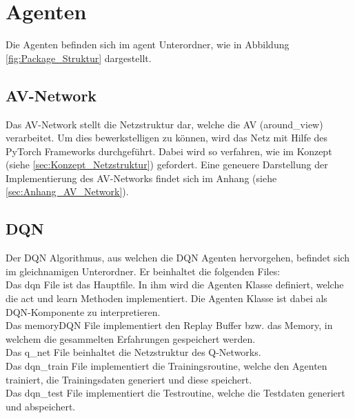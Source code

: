 \section{Agenten}
Die Agenten befinden sich im agent Unterordner, wie in Abbildung \ref{fig:Package_Struktur} dargestellt.

\subsection{AV-Network} \label{sec:Implementierung_AV_Network}
Das AV-Network stellt die Netzstruktur dar, welche die AV (around\_view) verarbeitet. Um dies bewerkstelligen zu können, wird das Netz mit Hilfe des PyTorch Frameworks durchgeführt. Dabei wird so verfahren, wie im Konzept (siehe \ref{sec:Konzept_Netzstruktur}) gefordert. Eine geneuere Darstellung der Implementierung des AV-Networks findet sich im Anhang (siehe \ref{sec:Anhang_AV_Network}).

\subsection{DQN}
Der DQN Algorithmus, aus welchen die DQN Agenten hervorgehen, befindet sich im gleichnamigen Unterordner. Er beinhaltet die folgenden Files:\\
Das dqn File ist das Hauptfile. In ihm wird die Agenten Klasse definiert, welche die act und learn Methoden implementiert. Die Agenten Klasse ist dabei als DQN-Komponente zu interpretieren.\\
Das memoryDQN File implementiert den Replay Buffer bzw. das Memory, in welchem die gesammelten Erfahrungen gespeichert werden.\\
Das q\_net File beinhaltet die Netzstruktur des Q-Networks.\\
Das dqn\_train File implementiert die Trainingsroutine, welche den Agenten trainiert, die Trainingsdaten generiert und diese speichert.\\
Das dqn\_test File implementiert die Testroutine, welche die Testdaten generiert und abspeichert.

